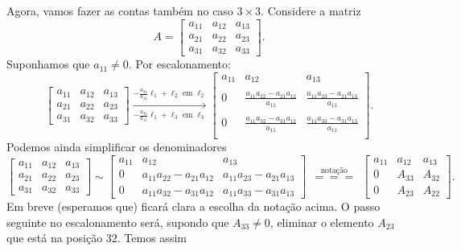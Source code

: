 Agora, vamos fazer as contas também no caso $3 \times 3$. Considere a matriz
\begin{equation}
A =
\begin{bmatrix}
a_{11} & a_{12} & a_{13} \\
a_{21} & a_{22} & a_{23} \\
a_{31} & a_{32} & a_{33}
\end{bmatrix}.
\end{equation} Suponhamos que $a_{11} \neq 0$. Por escalonamento:
\begin{equation}
\begin{bmatrix}
a_{11} & a_{12} & a_{13} \\
a_{21} & a_{22} & a_{23} \\
a_{31} & a_{32} & a_{33}
\end{bmatrix} \xrightarrow[- \frac{a_{31}}{a_{11}} \ell_1 + \ell_3 \text{ em } \ell_3]{- \frac{a_{21}}{a_{11}} \ell_1 + \ell_2 \text{ em } \ell_2}
\begin{bmatrix}
a_{11} & a_{12} & a_{13} \\ && \\
0 & \frac{a_{11} a_{22} - a_{21} a_{12}}{a_{11}} & \frac{a_{11} a_{23} - a_{21} a_{13}}{a_{11}} \\ && \\
0 & \frac{a_{11} a_{32} - a_{31} a_{12}}{a_{11}} & \frac{a_{11} a_{33} - a_{31} a_{13}}{a_{11}} \\
\end{bmatrix}.
\end{equation} Podemos ainda simplificar os denominadores
\begin{equation}
\begin{bmatrix}
a_{11} & a_{12} & a_{13} \\
a_{21} & a_{22} & a_{23} \\
a_{31} & a_{32} & a_{33}
\end{bmatrix} \sim
\begin{bmatrix}
a_{11} & a_{12} & a_{13} \\
0 & a_{11} a_{22} - a_{21} a_{12} & a_{11} a_{23} - a_{21} a_{13} \\
0 & a_{11} a_{32} - a_{31} a_{12} & a_{11} a_{33} - a_{31} a_{13}
\end{bmatrix} \ \ \stackrel{\text{notação}}{===} \ \  \begin{bmatrix}
a_{11} & a_{12} & a_{13} \\
0 & A_{33} & A_{32} \\
0 & A_{23} & A_{22}
\end{bmatrix}.
\end{equation} Em breve (esperamos que) ficará clara a escolha da notação acima. O passo seguinte no escalonamento será, supondo que $A_{33} \neq 0$, eliminar o elemento $A_{23}$ que está na posição $32$. Temos assim
